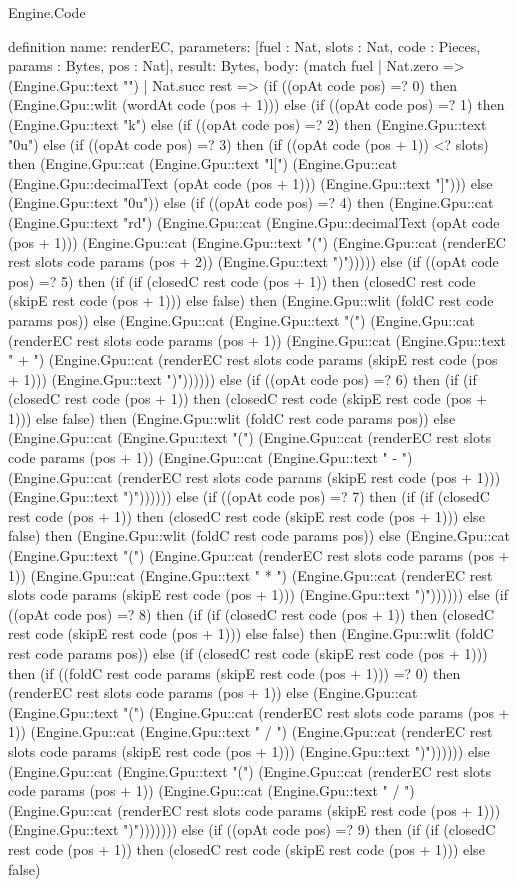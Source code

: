\begin{lexlean}{Engine.Code}
\begin{semanticmodule}
definition{
  name: renderEC,
  parameters: [fuel : Nat, slots : Nat, code : Pieces, params : Bytes, pos : Nat],
  result: Bytes,
  body: (match fuel
    | Nat.zero => (Engine.Gpu::text "")
    | Nat.succ rest => (if ((opAt code pos) =? 0) then (Engine.Gpu::wlit (wordAt code (pos + 1))) else (if ((opAt code pos) =? 1) then (Engine.Gpu::text "k") else (if ((opAt code pos) =? 2) then (Engine.Gpu::text "0u") else (if ((opAt code pos) =? 3) then (if ((opAt code (pos + 1)) <? slots) then (Engine.Gpu::cat (Engine.Gpu::text "l[") (Engine.Gpu::cat (Engine.Gpu::decimalText (opAt code (pos + 1))) (Engine.Gpu::text "]"))) else (Engine.Gpu::text "0u")) else (if ((opAt code pos) =? 4) then (Engine.Gpu::cat (Engine.Gpu::text "rd") (Engine.Gpu::cat (Engine.Gpu::decimalText (opAt code (pos + 1))) (Engine.Gpu::cat (Engine.Gpu::text "(") (Engine.Gpu::cat (renderEC rest slots code params (pos + 2)) (Engine.Gpu::text ")"))))) else (if ((opAt code pos) =? 5) then (if (if (closedC rest code (pos + 1)) then (closedC rest code (skipE rest code (pos + 1))) else false) then (Engine.Gpu::wlit (foldC rest code params pos)) else (Engine.Gpu::cat (Engine.Gpu::text "(") (Engine.Gpu::cat (renderEC rest slots code params (pos + 1)) (Engine.Gpu::cat (Engine.Gpu::text " + ") (Engine.Gpu::cat (renderEC rest slots code params (skipE rest code (pos + 1))) (Engine.Gpu::text ")")))))) else (if ((opAt code pos) =? 6) then (if (if (closedC rest code (pos + 1)) then (closedC rest code (skipE rest code (pos + 1))) else false) then (Engine.Gpu::wlit (foldC rest code params pos)) else (Engine.Gpu::cat (Engine.Gpu::text "(") (Engine.Gpu::cat (renderEC rest slots code params (pos + 1)) (Engine.Gpu::cat (Engine.Gpu::text " - ") (Engine.Gpu::cat (renderEC rest slots code params (skipE rest code (pos + 1))) (Engine.Gpu::text ")")))))) else (if ((opAt code pos) =? 7) then (if (if (closedC rest code (pos + 1)) then (closedC rest code (skipE rest code (pos + 1))) else false) then (Engine.Gpu::wlit (foldC rest code params pos)) else (Engine.Gpu::cat (Engine.Gpu::text "(") (Engine.Gpu::cat (renderEC rest slots code params (pos + 1)) (Engine.Gpu::cat (Engine.Gpu::text " * ") (Engine.Gpu::cat (renderEC rest slots code params (skipE rest code (pos + 1))) (Engine.Gpu::text ")")))))) else (if ((opAt code pos) =? 8) then (if (if (closedC rest code (pos + 1)) then (closedC rest code (skipE rest code (pos + 1))) else false) then (Engine.Gpu::wlit (foldC rest code params pos)) else (if (closedC rest code (skipE rest code (pos + 1))) then (if ((foldC rest code params (skipE rest code (pos + 1))) =? 0) then (renderEC rest slots code params (pos + 1)) else (Engine.Gpu::cat (Engine.Gpu::text "(") (Engine.Gpu::cat (renderEC rest slots code params (pos + 1)) (Engine.Gpu::cat (Engine.Gpu::text " / ") (Engine.Gpu::cat (renderEC rest slots code params (skipE rest code (pos + 1))) (Engine.Gpu::text ")")))))) else (Engine.Gpu::cat (Engine.Gpu::text "(") (Engine.Gpu::cat (renderEC rest slots code params (pos + 1)) (Engine.Gpu::cat (Engine.Gpu::text " / ") (Engine.Gpu::cat (renderEC rest slots code params (skipE rest code (pos + 1))) (Engine.Gpu::text ")"))))))) else (if ((opAt code pos) =? 9) then (if (if (closedC rest code (pos + 1)) then (closedC rest code (skipE rest code (pos + 1))) else false) }
\end{semanticmodule}
\end{lexlean}
